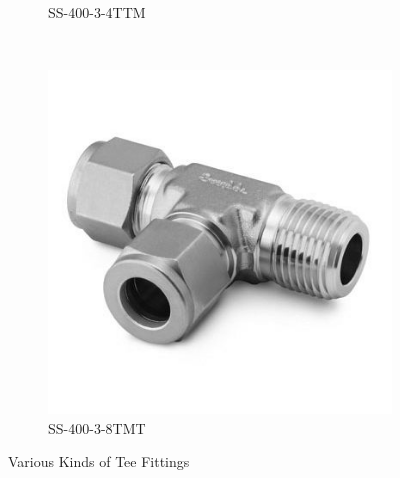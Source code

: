 \begin{figure}[H]
\begin{subfigure}[b]{0.21\textwidth}
    \caption{SS-400-3-4TTM}
    \end{subfigure}
    ~
    \begin{subfigure}[b]{0.21\textwidth}
    \centering
    \includegraphics[width=\textwidth]{appendix/img/interfaces/SS-400-3-8TMT.jpg}
    \caption{SS-400-3-8TMT}
    \end{subfigure}
    \caption{Various Kinds of Tee Fittings}
    \label{Appx:Tee_fittings}
\end{figure}


